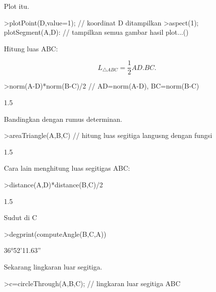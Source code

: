 \documentclass[a4paper,10pt]{article}
\begin{document}
\begin{eulernotebook}
\begin{eulercomment}
\begin{eulercomment}
\begin{eulercomment}
\begin{eulercomment}
\begin{eulercomment}
\begin{eulercomment}
\begin{eulercomment}
\begin{eulercomment}
\begin{eulercomment}
\begin{eulercomment}
\begin{eulercomment}
\begin{eulercomment}
\begin{eulercomment}
\begin{eulercomment}
\begin{eulercomment}
\begin{eulercomment}
\begin{eulerprompt}
\end{eulerprompt}
\begin{eulercomment}
Plot itu.
\end{eulercomment}
\begin{eulerprompt}
>plotPoint(D,value=1); // koordinat D ditampilkan
>aspect(1); plotSegment(A,D): // tampilkan semua gambar hasil plot...()
\end{eulerprompt}
\begin{eulercomment}
Hitung luas ABC:

\end{eulercomment}
\begin{eulerformula}
\[
L_{\triangle ABC}= \frac{1}{2}AD.BC.
\]
\end{eulerformula}
\begin{eulerprompt}
>norm(A-D)*norm(B-C)/2 // AD=norm(A-D), BC=norm(B-C)
\end{eulerprompt}
\begin{euleroutput}
  1.5
\end{euleroutput}
\begin{eulercomment}
Bandingkan dengan rumus determinan.
\end{eulercomment}
\begin{eulerprompt}
>areaTriangle(A,B,C) // hitung luas segitiga langusng dengan fungsi
\end{eulerprompt}
\begin{euleroutput}
  1.5
\end{euleroutput}
\begin{eulercomment}
Cara lain menghitung luas segitigas ABC:
\end{eulercomment}
\begin{eulerprompt}
>distance(A,D)*distance(B,C)/2
\end{eulerprompt}
\begin{euleroutput}
  1.5
\end{euleroutput}
\begin{eulercomment}
Sudut di C
\end{eulercomment}
\begin{eulerprompt}
>degprint(computeAngle(B,C,A))
\end{eulerprompt}
\begin{euleroutput}
  36°52'11.63''
\end{euleroutput}
\begin{eulercomment}
Sekarang lingkaran luar segitiga.
\end{eulercomment}
\begin{eulerprompt}
>c=circleThrough(A,B,C); // lingkaran luar segitiga ABC

\end{eulerprompt}
\end{eulercomment}
\end{eulercomment}
\end{eulercomment}
\end{eulercomment}
\end{eulercomment}
\end{eulercomment}
\end{eulercomment}
\end{eulercomment}
\end{eulercomment}
\end{eulercomment}
\end{eulercomment}
\end{eulercomment}
\end{eulercomment}
\end{eulercomment}
\end{eulercomment}
\end{eulercomment}
\end{eulernotebook}
\end{document}
